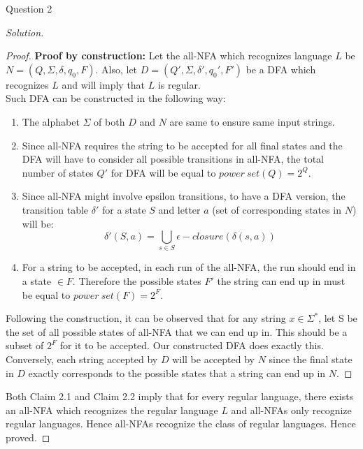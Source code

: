 \begin{solution}{Question 2}
\begin{proof}[Solution]
\begin{proof}
            \textbf{Proof by construction: }
            Let the all-NFA which recognizes language $L$ be $N = (Q, \Sigma, \delta, q_0, F)$. Also, let $D = (Q', \Sigma, \delta', q_0', F')$ be a DFA which recognizes $L$ and will imply that $L$ is regular.\\
            Such DFA can be constructed in the following way:
            \begin{enumerate}
                \item The alphabet $\Sigma$ of both $D$ and $N$ are same to ensure same input strings.
                \item Since all-NFA requires the string to be accepted for all final states and the DFA will have to consider all possible transitions in all-NFA, the total number of states $Q'$ for DFA will be equal to $power\ set (Q) = 2^Q$.
                \item Since all-NFA might involve epsilon transitions, to have a DFA version, the transition table $\delta'$ for a state $S$ and letter $a$ (set of corresponding states in $N$) will be:
                \begin{equation}
                 \delta'(S, a) =  \bigcup_{s \in S}  \epsilon-closure(\delta(s, a)) 
                \end{equation}
                 \item For a string to be accepted, in each run of the all-NFA, the run should end in a state $\in F$. Therefore the possible states $F'$ the string can end up in must be equal to $power\ set (F) = 2^F$.
                 
            \end{enumerate}
            
            Following the construction, it can be observed that for any string $x \in \Sigma^*$, let S be the set of all possible states of all-NFA that we can end up in. This should be a subset of $2^F$ for it to be accepted. Our constructed DFA does exactly this. Conversely, each string accepted by $D$ will be accepted by $N$ since the final state in $D$ exactly corresponds to the possible states that a string can end up in $N$.
        \end{proof}
        Both Claim 2.1 and Claim 2.2 imply that for every regular language, there exists an all-NFA which recognizes the regular language $L$ and all-NFAs only recognize regular languages. Hence all-NFAs recognize the class of regular languages. Hence proved.
        
        
    \end{proof}
\end{solution}
